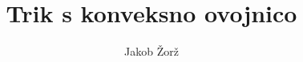 \documentclass[a4paper]{article}
\begin{document}
    \title{Trik s konveksno ovojnico}
    \author{Jakob Žorž}
    \maketitle

    
    
    
    
\end{document}
